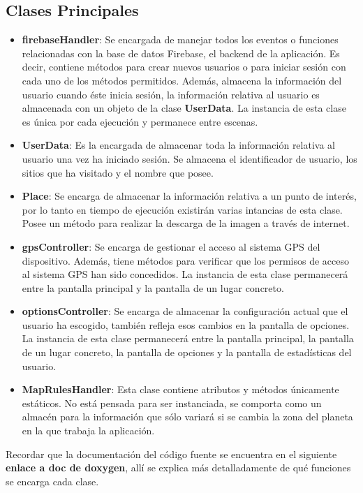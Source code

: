 \documentclass{report}
\begin{document}
\subsection{Clases Principales}
\begin{itemize}
\item \textbf{firebaseHandler}: Se encargada de manejar todos los eventos o funciones relacionadas con la base de datos Firebase, el backend de la aplicación. Es decir, contiene métodos para crear nuevos usuarios o para iniciar sesión con cada uno de los métodos permitidos. Además, almacena la información del usuario cuando éste inicia sesión, la información relativa al usuario es almacenada con un objeto de la clase \textbf{UserData}. La instancia de esta clase es única por cada ejecución y permanece entre escenas.
\item \textbf{UserData}: Es la encargada de almacenar toda la información relativa al usuario una vez ha iniciado sesión. Se almacena el identificador de usuario, los sitios que ha visitado y el nombre que posee.
\item \textbf{Place}: Se encarga de almacenar la información relativa a un punto de interés, por lo tanto en tiempo de ejecución existirán varias intancias de esta clase. Posee un método para realizar la descarga de la imagen a través de internet.
\item \textbf{gpsController}: Se encarga de gestionar el acceso al sistema GPS del dispositivo. Además, tiene métodos para verificar que los permisos de acceso al sistema GPS han sido concedidos. La instancia de esta clase permanecerá entre la pantalla principal y la pantalla de un lugar concreto.
\item \textbf{optionsController}: Se encarga de almacenar la configuración actual que el usuario ha escogido, también refleja esos cambios en la pantalla de opciones. La instancia de esta clase permanecerá entre la pantalla principal, la pantalla de un lugar concreto, la pantalla de opciones y la pantalla de estadísticas del usuario.
\item \textbf{MapRulesHandler}: Esta clase contiene atributos y métodos únicamente estáticos. No está pensada para ser instanciada, se comporta como un almacén para la información que sólo variará si se cambia la zona del planeta en la que trabaja la aplicación.
\end{itemize}

Recordar que la documentación del código fuente se encuentra en el siguiente \textbf{enlace a doc de doxygen}, allí se explica más detalladamente de qué funciones se encarga cada clase.
\end{document}
